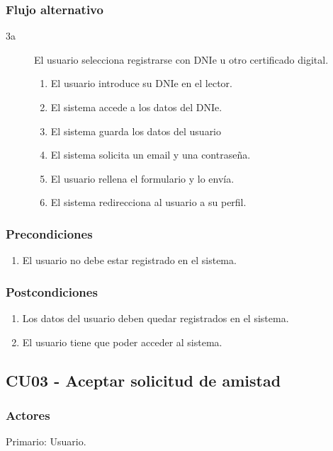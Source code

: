 \documentclass[12pt, a4paper, titlepage]{article}
\begin{document}
\subsubsection{Flujo alternativo}
\begin{description}
\item [3a] El usuario selecciona registrarse con DNIe u otro certificado digital.
	\begin{enumerate}
		\item El usuario introduce su DNIe en el lector.
		\item El sistema accede a los datos del DNIe.
		\item El sistema guarda los datos del usuario
		\item El sistema solicita un email y una contraseña.
		\item El usuario rellena el formulario y lo envía.
		\item El sistema redirecciona al usuario a su perfil.
	\end{enumerate}
\end{description}

\subsubsection{Precondiciones}
\begin{enumerate}
	\item El usuario no debe estar registrado en el sistema.
\end{enumerate}
\subsubsection{Postcondiciones}
\begin{enumerate}
	\item Los datos del usuario deben quedar registrados en el sistema.
	\item El usuario tiene que poder acceder al sistema.
\end{enumerate}


\subsection{CU03 - Aceptar solicitud de amistad}
\subsubsection{Actores}
Primario: Usuario.
\end{document}
